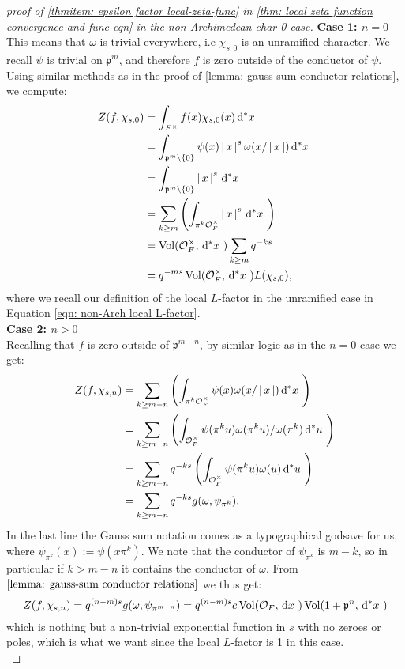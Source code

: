 \documentclass[11pt, x11names, openany]{book}
\newcommand{\pp}{\mathfrak{p}}
\newcommand{\set}[1]{\left\{ #1 \right\}}
\renewcommand{\brack}[1]{\left(   #1 \right)}
\newcommand{\abs}[1]{\left| \, #1  \,\right|}
\newcommand{\dx}{\, \mathrm{d}x \ }
\renewcommand{\d}[1]{\, \mathrm{d}#1 \ }
\DeclareMathOperator{\vol}{Vol}
\begin{document}
\begin{proof}[proof of \ref{thmitem: epsilon factor local-zeta-func} in \ref{thm: local zeta function convergence and func-eqn} in the non-Archimedean char 0 case]
\underline{\textbf{Case 1: $n = 0$}}\\
This means that $\omega$ is trivial everywhere, i.e $\chi_{s, 0}$ is an unramified character. We recall $\psi$ is trivial on $\pp^m$, and therefore $f$ is zero outside of the conductor of $\psi$. Using similar methods as in the proof of \ref{lemma: gauss-sum conductor relations}, we compute:
\begin{align}
\label{eqn: local zeta function non-Arch unramified}
    Z(f, \chi_{s, 0}) &= \int_{F^\times} f(x)\chi_{s, 0}(x) \d{^*x} \nonumber \\
    &= \int_{\pp^m \setminus \set{0}} \psi(x) \abs{x}^s \omega(x/\abs{x}) \d{^*x} \nonumber \\
    &= \int_{\pp^m \setminus \set{0}} \abs{x}^s \d{^*x}\nonumber \\
    &= \sum_{k \geq m} \brack{\int_{\pi^k \calo_F^\times} \abs{x}^s \d{^*x}}\nonumber \\
    &= \vol(\calo_F^\times, \d{^*x}) \sum_{k \geq m} q^{-ks}\nonumber \\
    &= q^{-ms} \vol(\calo_F^\times, \d{^*x} ) L(\chi_{s, 0}),
\end{align}
where we recall our definition of the local $L$-factor in the unramified case in Equation \ref{eqn: non-Arch local L-factor}.\\

\underline{\textbf{Case 2: $n > 0$}}\\
Recalling that $f$ is zero outside of $\pp^{m-n}$, by similar logic as in the $n=0$ case we get:
\begin{align*}
    Z(f, \chi_{s, n}) &= \sum_{k \geq m-n} \brack{ \int_{\pi^k \calo_F^\times} \psi(x) \omega(x/\abs{x}) \d{^*x}}\\
    &= \sum_{k \geq m-n} \brack{ \int_{\calo_F^\times} \psi(\pi^k u) \omega(\pi^k u)/\omega(\pi^k) \d{^*u}}\\
    &= \sum_{k \geq m-n} q^{-ks} \brack{\int_{\calo_F^\times} \psi(\pi^k u) \omega(u) \d{^*u}}\\
    &= \sum_{k \geq m-n}q^{-ks}g(\omega, \psi_{\pi^k}).
\end{align*}
In the last line the Gauss sum notation comes as a typographical godsave for us, where $\psi_{\pi^k}(x) := \psi(x \pi^k)$. We note that the conductor of $\psi_{\pi^k}$ is $m-k$, so in particular if $k > m - n$ it contains the conductor of $\omega$. From $\ref{lemma: gauss-sum conductor relations}$ we thus get:
\begin{equation}
\label{eqn: local zeta function non-Arch ramified}
    Z(f, \chi_{s, n}) = q^{(n-m)s} g(\omega, \psi_{\pi^{m-n}}) = q^{(n-m)s} c \vol(\calo_F, \dx) \vol(1 + \pp^n, \d{^*x})
\end{equation}
which is nothing but a non-trivial exponential function in $s$ with no zeroes or poles, which is what we want since the local $L$-factor is 1 in this case.\\


\end{proof}
\end{document}
